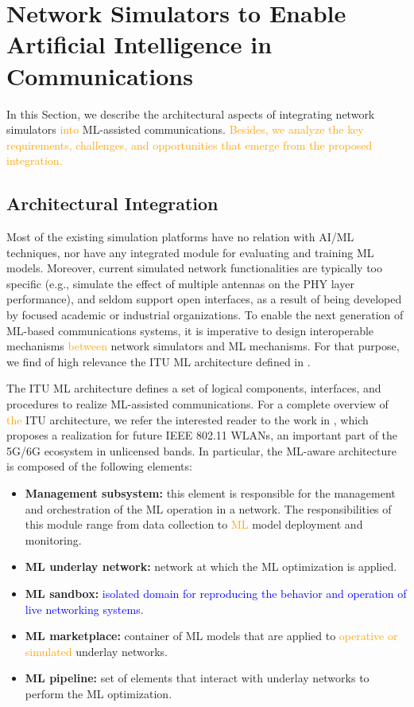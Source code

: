 \documentclass[journal]{IEEEtran}
\begin{document}
	\section{Network Simulators to Enable Artificial Intelligence in Communications}	
	In this Section, we describe the architectural aspects of integrating network simulators \textcolor{orange}{into} ML-assisted communications. \textcolor{orange}{Besides, we analyze the key requirements, challenges, and opportunities that emerge from the proposed integration.}
	
	\subsection{Architectural Integration}
	Most of the existing simulation platforms have no relation with AI/ML techniques, nor have any integrated module for evaluating and training ML models. Moreover, current simulated network functionalities are typically too specific (e.g., simulate the effect of multiple antennas on the PHY layer performance), and seldom support open interfaces, as a result of being developed by focused academic or industrial organizations. To enable the next generation of ML-based communications systems, it is imperative to design interoperable mechanisms \textcolor{orange}{between} network simulators and ML mechanisms. For that purpose, we find of high relevance the ITU ML architecture defined in \cite{ITU3172}.	
	
    The ITU ML architecture defines a set of logical components, interfaces, and procedures to realize ML-assisted communications. For a complete overview of \textcolor{orange}{the} ITU architecture, we refer the interested reader to the work in \cite{itu_architecture}, which proposes a realization for future IEEE 802.11 WLANs, an important part of the 5G/6G ecosystem in unlicensed bands. In particular, the ML-aware architecture is composed of the following elements:
	\begin{itemize}
		\item \textbf{Management subsystem:} this element is responsible for the management and orchestration of the ML operation in a network. The responsibilities of this module range from data collection to \textcolor{orange}{ML} model deployment and monitoring.
		\item \textbf{ML underlay network:} network at which the ML optimization is applied.
		\item \textbf{ML sandbox:} \textcolor{blue}{isolated domain for reproducing the behavior and operation of live networking systems.}		
		\item \textbf{ML marketplace:} container of ML models that are applied to \textcolor{orange}{operative or simulated} underlay networks.
		\item \textbf{ML pipeline:} set of elements that interact with underlay networks to perform the ML optimization. 
	\end{itemize} 
	
\end{document}
